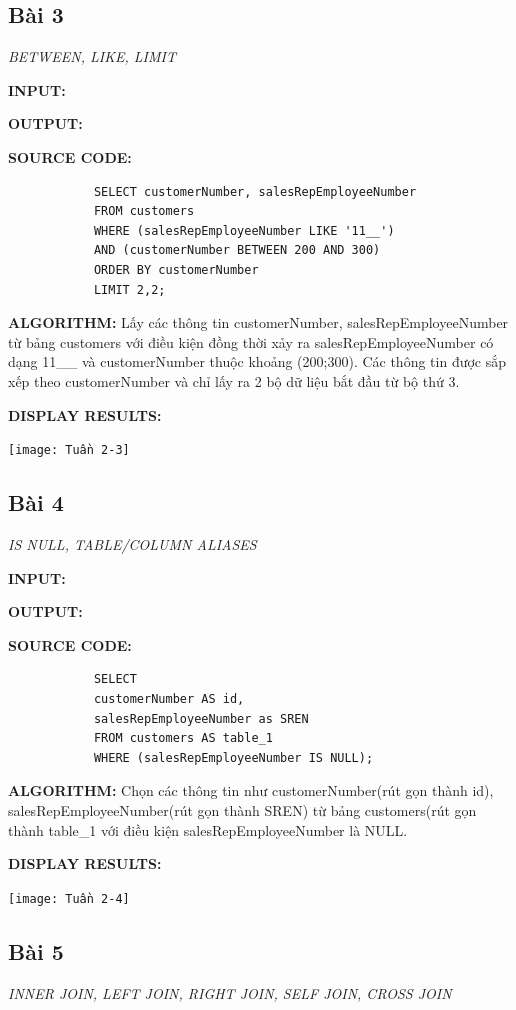 \documentclass[12pt,a4paper]{report}
\begin{document}
\subsection{Bài 3}
	\begin{center}
		{\it BETWEEN, LIKE, LIMIT}
	\end{center}
	
	{\bf INPUT:}
	
	{\bf OUTPUT:}
	
	{\bf SOURCE CODE:}
		\begin{lstlisting}
			SELECT customerNumber, salesRepEmployeeNumber
			FROM customers
			WHERE (salesRepEmployeeNumber LIKE '11__')
			AND (customerNumber BETWEEN 200 AND 300)
			ORDER BY customerNumber
			LIMIT 2,2;
		\end{lstlisting}
	
	{\bf ALGORITHM:}
		Lấy các thông tin customerNumber, salesRepEmployeeNumber từ bảng customers với điều kiện đồng thời xảy ra salesRepEmployeeNumber có dạng 11\_\_ và customerNumber thuộc khoảng (200;300). Các thông tin được sắp xếp theo customerNumber và chỉ lấy ra 2 bộ dữ liệu bắt đầu từ bộ thứ 3.
	
	{\bf DISPLAY RESULTS:}
		\begin{center}
			\texttt{[image: Tuần 2-3]}
		\end{center}
	
\subsection{Bài 4}
	\begin{center}
		{\it IS NULL, TABLE/COLUMN ALIASES}
	\end{center}
	
	{\bf INPUT:}
	
	{\bf OUTPUT:}
	
	{\bf SOURCE CODE:}
		\begin{lstlisting}
			SELECT
			customerNumber AS id,
			salesRepEmployeeNumber as SREN
			FROM customers AS table_1
			WHERE (salesRepEmployeeNumber IS NULL);				
		\end{lstlisting}
	{\bf ALGORITHM:}
		Chọn các thông tin như customerNumber(rút gọn thành id), salesRepEmployeeNumber(rút gọn thành SREN) từ bảng customers(rút gọn thành table\_1 với điều kiện salesRepEmployeeNumber là NULL.
	
	{\bf DISPLAY RESULTS:}
		\begin{center}
			\texttt{[image: Tuần 2-4]}
		\end{center}
\subsection{Bài 5}
	\begin{center}
		{\it INNER JOIN, LEFT JOIN, RIGHT JOIN, SELF JOIN, CROSS JOIN}
	\end{center}
	
\end{document}
